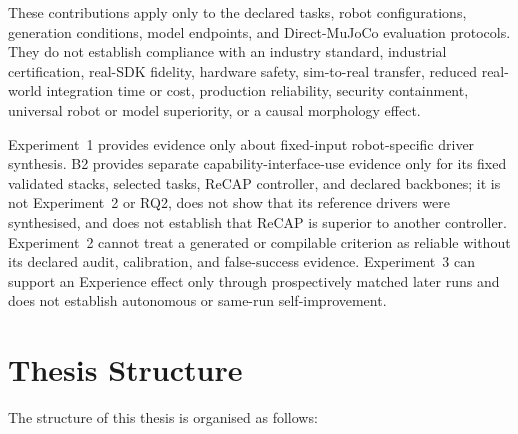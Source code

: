 These contributions apply only to the declared tasks, robot configurations,
generation conditions, model endpoints, and Direct-MuJoCo evaluation
protocols. They do not establish compliance with an industry standard,
industrial certification, real-SDK fidelity, hardware safety, sim-to-real
transfer, reduced real-world integration time or cost, production reliability,
security containment, universal robot or model superiority, or a causal
morphology effect.

Experiment~1 provides evidence only about fixed-input robot-specific driver
synthesis. B2 provides separate capability-interface-use evidence only for its
fixed validated stacks, selected tasks, ReCAP controller, and declared
backbones; it is not Experiment~2 or RQ2, does not show that its reference
drivers were synthesised, and does not establish that ReCAP is superior to
another controller. Experiment~2 cannot treat a generated or compilable
criterion as reliable without its declared audit, calibration, and
false-success evidence. Experiment~3 can support an Experience effect only
through prospectively matched later runs and does not establish autonomous or
same-run self-improvement.


\section[Thesis Structure]{Thesis Structure}
\label{sec:intro-structure}

The structure of this thesis is organised as follows:

